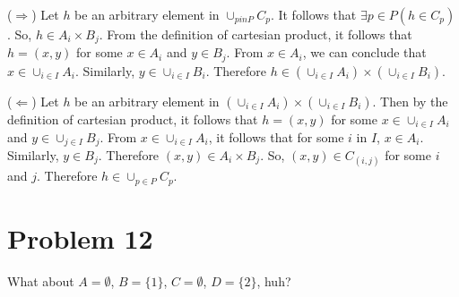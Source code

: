\documentclass{article}
\begin{document}
($\Rightarrow$) Let $h$ be an arbitrary element in $\cup_{p in P}C_p$.
It follows that $\exists p \in P(h \in C_p)$. So, $h \in A_i \times
B_j$. From the definition of cartesian product, it follows that $h =
(x,y)$ for some $x \in A_i$ and $y \in B_j$. From $x \in A_i$, we can
conclude that $x \in \cup_{i \in I}A_i$. Similarly, $y \in \cup_{i \in
I}B_i$. Therefore $h \in (\cup_{i \in I}A_i) \times (\cup_{i \in I}B_i)$.

($\Leftarrow$) Let $h$ be an arbitrary element in $(\cup_{i \in I}A_i)
\times (\cup_{i \in I}B_i)$. Then by the definition of cartesian
product, it follows that $h = (x,y)$ for some $x \in \cup_{i \in
  I}A_i$ and $y \in \cup_{j \in I}B_j$. From $x \in \cup_{i \in
  I}A_i$, it follows that for some $i$ in $I$, $x \in A_i$. Similarly,
$y \in B_j$. Therefore $(x,y) \in A_i \times B_j$. So, $(x,y) \in
C_{(i,j)}$ for some $i$ and $j$. Therefore $h \in \cup_{p \in P}C_p$.

\section{Problem 12}

What about $A = \emptyset $, $B = \{1\}$, $C = \emptyset$, $D =
\{2\}$, huh?
\end{document}
